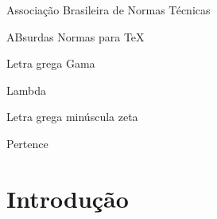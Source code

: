 \documentclass[
	12pt,				%
	openright,			%
	twoside,			%
	a4paper,			%
	english,			%
	french,				%
	spanish,			%
	brazil,				%
	]{abntex2}
\begin{document}

\frenchspacing 


\imprimircapa

\imprimirfolhaderosto


\listoffigures*
\cleardoublepage

\listoftables*
\cleardoublepage

\begin{siglas}
  \item[ABNT] Associação Brasileira de Normas Técnicas
  \item[abnTeX] ABsurdas Normas para TeX
\end{siglas}

\begin{simbolos}
  \item[$ \Gamma $] Letra grega Gama
  \item[$ \Lambda $] Lambda
  \item[$ \zeta $] Letra grega minúscula zeta
  \item[$ \in $] Pertence
\end{simbolos}

\tableofcontents*
\cleardoublepage


\textual

\chapter*[Introdução]{Introdução}
\end{document}
